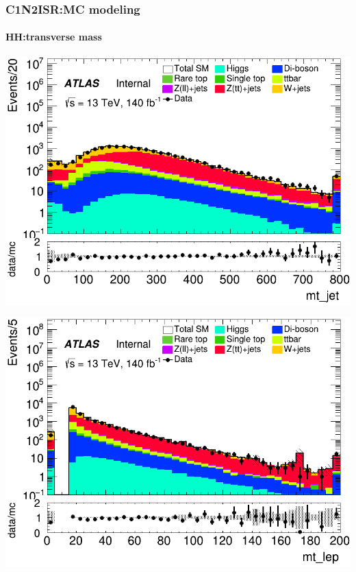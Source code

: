 \documentclass[usenames,dvipsnames]{beamer}
\begin{document}
\begin{frame}
\frametitle{C1N2ISR:MC modeling}
\framesubtitle{HH:\quad transverse mass}
    \begin{minipage}{0.32\textwidth}
        \centering
        \includegraphics[width=\textwidth]{graphics/HH_met/HH_met_mt_jet.png}
    \end{minipage}
    \hfill
    \begin{minipage}{0.32\textwidth}
        \centering
        \includegraphics[width=\textwidth]{graphics/HH_met/HH_met_mt_lep.png}
    \end{minipage}
    \hfill
    \begin{minipage}{0.32\textwidth}
        \centering

\end{minipage}
\end{frame}
\end{document}

